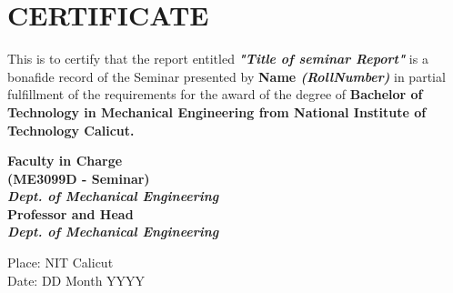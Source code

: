 

\chapter*{\centering \textbf{\MakeUppercase{CERTIFICATE}}}
\justifying
\normalsize This is to certify that the report entitled  \textbf{\textit{ "Title of seminar Report"}} is a bonafide record of the Seminar presented by \textbf{ Name \textit{ (RollNumber)}} in partial fulfillment of the requirements for the award of the degree of \bf{Bachelor of Technology in Mechanical Engineering from National Institute of Technology Calicut}.\\[1.0cm]    

\begin{flushright}
\texttt{}\bf{Faculty in Charge}\texttt{}\\
(ME3099D - Seminar)\\
\emph{Dept. of Mechanical Engineering}\\[1.5cm]

\textbf{Professor and Head}\\
\emph{Dept. of Mechanical Engineering}
\end{flushright}

\begin{flushleft}
Place: NIT Calicut\\
\vspace{1.0pt}
Date: DD Month YYYY
\end{flushleft}
